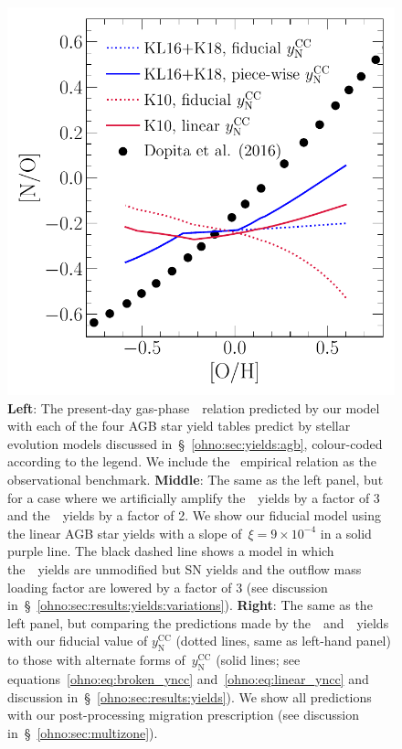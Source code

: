 \begin{figure}
\includegraphics[scale = 0.45]{no_oh_predictions_karakas.pdf}
\caption{
\textbf{Left}: The present-day gas-phase~\ohno~relation predicted by our
model with each of the four AGB star yield tables predict by stellar evolution
models discussed in~\S~\ref{ohno:sec:yields:agb}, colour-coded according to the
legend.
We include the~\citet{Dopita2016} empirical relation as the observational
benchmark.
\textbf{Middle}: The same as the left panel, but for a case where we
artificially amplify the~\cristallo~yields by a factor of 3 and
the~\ventura~yields by a factor of 2.
We show our fiducial model using the linear AGB star yields with a slope
of~$\xi = 9\times10^{-4}$ in a solid purple line.
The black dashed line shows a model in which the~\cristallo~yields are
unmodified but SN yields and the outflow mass loading factor are lowered by a
factor of 3 (see discussion in~\S~\ref{ohno:sec:results:yields:variations}).
\textbf{Right}: The same as the left panel, but comparing the predictions made
by the~\karakasten~and~\karakas~yields with our fiducial value of
$y_\text{N}^\text{CC}$ (dotted lines, same as left-hand panel) to those with
alternate forms of~$y_\text{N}^\text{CC}$ (solid lines; see
equations~\ref{ohno:eq:broken_yncc} and~\ref{ohno:eq:linear_yncc} and discussion
in~\S~\ref{ohno:sec:results:yields}).
We show all predictions with our post-processing migration prescription (see
discussion in~\S~\ref{ohno:sec:multizone}).
}
\label{ohno:fig:no_oh_predictions}
\end{figure}


